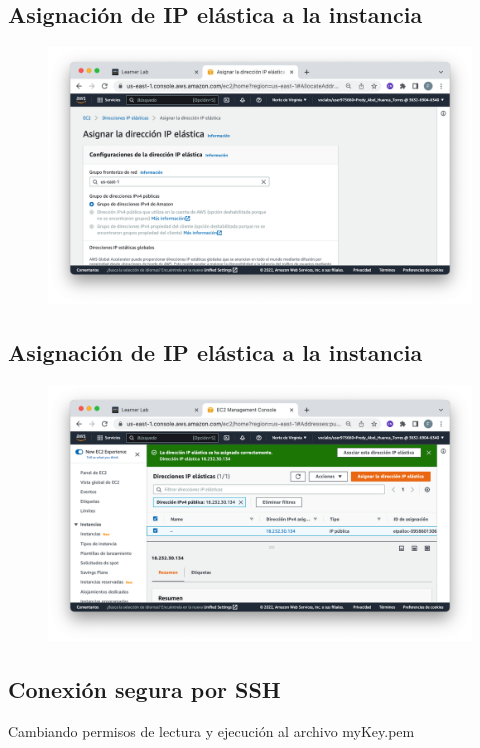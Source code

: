 \subsection{Asignación de IP elástica a la instancia}
\begin{figure}[h]
	\centering
	\includegraphics[scale=.35] {img/09-asignacionDeIpElastica}
	\caption{}
	\label{fig:9}	
\end{figure} 

\clearpage

\subsection{Asignación de IP elástica a la instancia}
\begin{figure}[h]
	\centering
	\includegraphics[scale=.35] {img/10-asigacionCorrectaIpElastica}
	\caption{}
	\label{fig:10}	
\end{figure} 

\subsection{Conexión segura por SSH}
Cambiando permisos de lectura y ejecución al archivo myKey.pem


